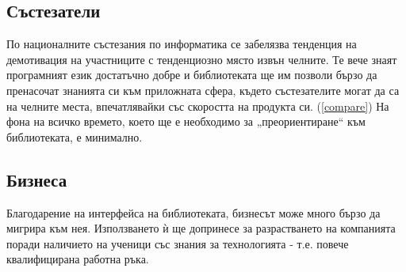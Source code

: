 \documentclass[documentation.tex]{subfiles}
\begin{document}
    \subsection{Състезатели}
    \begin{text} \par
        По националните състезания по информатика се забелязва тенденция на демотивация на участниците с тенденциозно място извън челните. Те вече знаят програмният език достатъчно добре и библиотеката ще им позволи бързо да пренасочат знанията си към приложната сфера, където състезателите могат да са на челните места, впечатлявайки със скоростта на продукта си. (\ref{compare}) На фона на всичко времето, което ще е необходимо за „преориентиране“ към библиотеката, е минимално.
    \end{text}
    \subsection{Бизнеса}
    \begin{text} \par
        Благодарение на интерфейса на библиотеката, бизнесът може много бързо да мигрира към нея. Използването ѝ ще допринесе за разрастването на компанията поради наличието на ученици със знания за технологията - т.е. повече квалифицирана работна ръка.
    \end{text}
    
\end{document}

